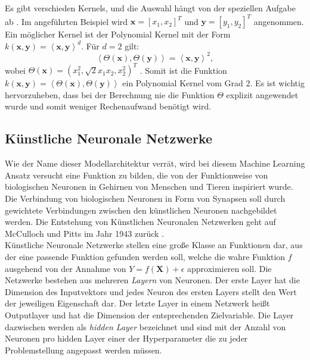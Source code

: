 Es gibt verschieden Kernels, und die Auswahl h\"angt von der speziellen Aufgabe ab \cite{SVM1}. Im angef\"uhrten Beispiel wird $ \mathbf{x} = [x_1, x_2]^T$ und $\mathbf{y} = [y_1, y_2]^T$ angenommen.
Ein m\"oglicher Kernel ist der Polynomial Kernel mit der Form 
$k(\mathbf{x}, \mathbf{y}) = \left\langle \mathbf{x}, \mathbf{y} \right\rangle^d$. F\"ur $d=2$ gilt:
$$ \left\langle \Theta(\mathbf{x}), \Theta(\mathbf{y}) \right\rangle = \left\langle \mathbf{x}, \mathbf{y} \right\rangle^2, $$
wobei $\Theta(\mathbf{x}) = (x_1^2, \sqrt{2}x_1x_2, x_2^2)^T$ \cite{handson}. 
Somit ist die Funktion $k(\mathbf{x}, \mathbf{y}) = \left\langle \Theta(\mathbf{x}), \Theta(\mathbf{y}) \right\rangle$
ein Polynomial Kernel vom Grad 2. Es ist wichtig hervorzuheben, dass bei der Berechnung nie die Funktion $\Theta$ explizit angewendet wurde \cite{handson}
und somit weniger Rechenaufwand ben\"otigt wird. \\































\subsection{K\"unstliche Neuronale Netzwerke}
Wie der Name dieser Modellarchitektur verr\"at, wird bei diesem Machine Learning Ansatz versucht eine Funktion zu bilden, die von der Funktionweise
von biologischen Neuronen in Gehirnen von Menschen und Tieren inspiriert wurde. Die Verbindung von biologischen Neuronen in Form von Synapsen soll durch gewichtete
Verbindungen zwischen den k\"unstlichen Neuronen nachgebildet werden. Die Entstehung von K\"unstlichen Neuronalen Netzwerken 
geht auf McCulloch und Pitts im Jahr 1943 zur\"uck \cite{McCulloch}. \\

K\"unstliche Neuronale Netzwerke stellen eine gro{\ss}e Klasse an Funktionen dar, aus der eine passende Funktion gefunden werden soll, welche 
die wahre Funktion $f$ ausgehend von der Annahme von $Y = f(\mathbf{X}) + \epsilon$ approximieren soll. Die Netzwerke bestehen aus mehreren \textit{Layern} von Neuronen. Der erste Layer hat 
die Dimension des Inputvektors und jedes Neuron des ersten Layers stellt den Wert der jeweiligen Eigenschaft dar. Der letzte Layer in einem Netzwerk hei{\ss}t 
Outputlayer und hat die Dimension der entsprechenden Zielvariable. Die Layer dazwischen werden als \textit{hidden Layer} bezeichnet und sind mit der Anzahl von Neuronen pro 
hidden Layer einer der Hyperparameter die zu jeder Problemstellung angepasst werden m\"ussen. \\

